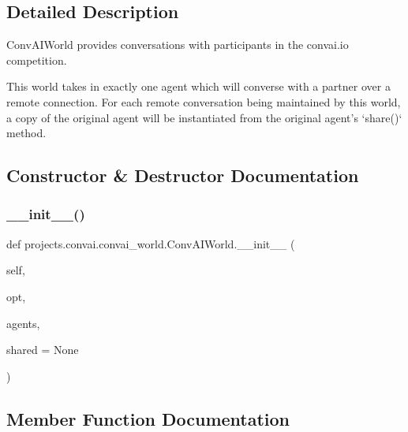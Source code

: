 \subsection{Detailed Description}
\begin{DoxyVerb}ConvAIWorld provides conversations with participants in the convai.io competition.

This world takes in exactly one agent which will converse with a partner over a
remote connection. For each remote conversation being maintained by this world, a
copy of the original agent will be instantiated from the original agent's `share()`
method.
\end{DoxyVerb}
 

\subsection{Constructor \& Destructor Documentation}
\mbox{\label{classprojects_1_1convai_1_1convai__world_1_1ConvAIWorld_abe0fa741d2ed06b8222ef930e1f7ab24}} 
\subsubsection{\texorpdfstring{\+\_\+\+\_\+init\+\_\+\+\_\+()}{\_\_init\_\_()}}
{\footnotesize\ttfamily def projects.\+convai.\+convai\+\_\+world.\+Conv\+A\+I\+World.\+\_\+\+\_\+init\+\_\+\+\_\+ (\begin{DoxyParamCaption}\item[{}]{self,  }\item[{}]{opt,  }\item[{}]{agents,  }\item[{}]{shared = {\ttfamily None} }\end{DoxyParamCaption})}



\subsection{Member Function Documentation}
\mbox{\label{classprojects_1_1convai_1_1convai__world_1_1ConvAIWorld_afa6808254f400537a59fdd19d3574838}} 

